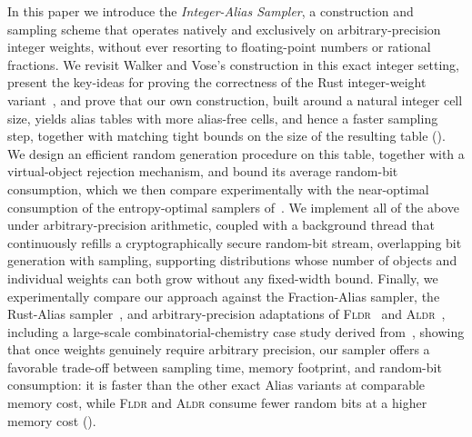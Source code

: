 In this paper we introduce the \emph{Integer-Alias Sampler}, a construction and sampling scheme that
operates natively and exclusively on arbitrary-precision integer weights, without ever resorting to
floating-point numbers or rational fractions. We revisit Walker and Vose's construction in this exact
integer setting, present the key-ideas for proving the correctness of the Rust integer-weight variant~\cite{Rust25}, and
prove that our own construction, built around a natural integer cell size, yields alias tables with more
alias-free cells, and hence a faster sampling step, together with matching tight bounds on the size of the
resulting table (). We design an efficient random generation procedure on this
table, together with a virtual-object rejection mechanism, and bound its average random-bit consumption,
which we then compare experimentally with the near-optimal consumption of the entropy-optimal samplers
of~\cite{SFRM19,DS26}. We
implement all of the above under arbitrary-precision arithmetic, coupled with a background thread that
continuously refills a cryptographically secure random-bit stream, overlapping bit generation with sampling, supporting
distributions whose number of objects and individual weights can both grow without any fixed-width bound.
Finally, we experimentally compare our approach against the Fraction-Alias sampler, the Rust-Alias
sampler~\cite{Rust25}, and arbitrary-precision adaptations of \textsc{Fldr}~\cite{SFRM19} and
\textsc{Aldr}~\cite{DS26}, including a large-scale combinatorial-chemistry case study derived
from~\cite{MR25,SSHL26}, showing that once weights genuinely require arbitrary precision, our sampler offers
a favorable trade-off between sampling time, memory footprint, and random-bit consumption: it is faster than
the other exact Alias variants at comparable memory cost, while \textsc{Fldr} and \textsc{Aldr} consume fewer
random bits at a higher memory cost ().
